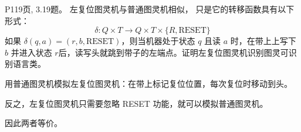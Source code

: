 \documentclass[11pt,addpoints,answers]{exam}
\begin{document}
\begin{questions}
\begin{solution}
		\end{solution} 
		
			\question P119页, 3.19题。
		左复位图灵机与普通图灵机相似， 只是它的转移函数具有以下形式：
		\[
		\delta:Q\times T\rightarrow Q\times T\times \{R,\text{RESET}\}
		\]
		如果 $\delta(q,a)=(r,b,\text{RESET})$，则当机器处于状态 $q$ 且读 $a$ 时，在带上上写下 $b$ 并进入状态 $r$后，读写头就跳到带子的左端点。证明左复位图灵机识别图灵可识别语言类。
		\begin{solution}
			用普通图灵机模拟左复位图灵机：在带上标记复位位置，每次复位时移动到头。
            
            反之，左复位图灵机只需要忽略 RESET 功能，就可以模拟普通图灵机。
            
            因此两者等价。
			
		\end{solution}
	\end{questions}
	
\end{document}
